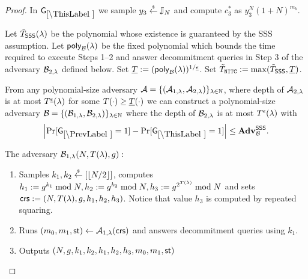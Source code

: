 \begin{proof}
%


In $\games_\thisgame$ we sample $y_3 \stackrel{{\scriptscriptstyle\$}}{\leftarrow} \mathbb{J}_N$ and compute $c_3^*$ as $y_3^N (1+N)^{m_b}$.

Let $\tilde{T}_\mathsf{SSS}(\lambda)$ be the polynomial whose existence is guaranteed by the SSS assumption.
Let $\mathsf{poly}_{\mathcal{B}}(\lambda)$ be the fixed polynomial which bounds the time required to execute Steps 1--2 and answer decommitment queries in Step 3 of the adversary $\mathcal{B}_{2, \lambda}$ defined below. Set $\underline{T} := (\mathsf{poly}_{\mathcal{B}}(\lambda))^{1 / \underline{\epsilon}}$.  Set $\tilde{T}_{\mathtt{NITC}} := \max(\tilde{T}_\mathsf{SSS}, \underline{T})$.
\begin{lemma}
From any polynomial-size adversary $\mathcal{A} = \{(\mathcal{A}_{1,\lambda}, \mathcal{A}_{2, \lambda})\}_{\lambda \in \mathbb{N}}$, where depth of $\mathcal{A}_{2, \lambda}$ is at most $T^{\underline{\epsilon}}(\lambda)$ for some $T(\cdot) \geq \underline{T}(\cdot)$ we can construct a polynomial-size adversary $\mathcal{B} = \{(\mathcal{B}_{1,\lambda}, \mathcal{B}_{2, \lambda})\}_{\lambda \in \mathbb{N}}$ where the depth of $\mathcal{B}_{2, \lambda}$ is at most $T^{\epsilon}(\lambda)$ with
\[
\left|\Pr[\games_\prevgame = 1] - \Pr[\games_\thisgame = 1]\right| \leq \advtg_\advB^\sss.
\]
\end{lemma}

The adversary $\mathcal{B}_{1,\lambda}(N, T(\lambda), g):$
\vspace{-2mm}
\begin{enumerate}
\item Samples $k_1, k_2 \stackrel{{\scriptscriptstyle\$}}{\leftarrow} [\left\lfloor N/2 \right\rfloor]$, computes $h_1 := g^{k_1} \bmod N, h_2 := g^{k_2} \bmod N,  h_3 := g^{2^{T(\lambda)}} \bmod N$ and sets $\mathsf{crs}:=(N, T(\lambda), g, h_1, h_2, h_3)$. Notice that value $h_3$ is computed by repeated squaring.
\item Runs $(m_0, m_1, \mathsf{st}) \leftarrow \mathcal{A}_{1, \lambda}(\mathsf{crs})$ and answers decommitment queries using $k_1$.
\item Outputs $(N,g,k_1, k_2, h_1,h_2,h_3, m_0, m_1, \mathsf{st})$
\end{enumerate}


\end{proof}
